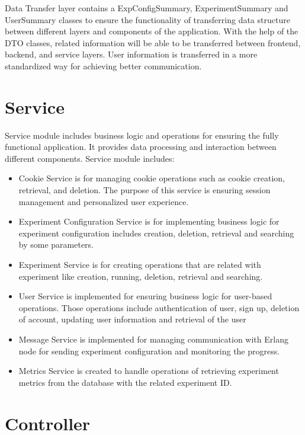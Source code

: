 Data Transfer layer contains a ExpConfigSummary, ExperimentSummary and UserSummary classes to ensure the functionality of transferring data structure between different layers and components of the application. With the help of the DTO classes,
related information will be able to be transferred between frontend, backend, and service layers. User information is transferred in a more standardized way
for achieving better communication.

\section{Service}

Service module includes business logic and operations for ensuring the fully functional application. It provides data processing and interaction between different components. Service module includes:\\
\begin{itemize}
    \item Cookie Service is for managing cookie operations such as cookie creation, retrieval, and deletion. The purpose of this service is ensuring session management and personalized user experience.
    \item Experiment Configuration Service is for implementing business logic for experiment configuration includes creation, deletion, retrieval and searching by some parameters.
    \item Experiment Service is for creating operations that are related with experiment like creation, running, deletion, retrieval and searching.
    \item User Service is implemented for ensuring business logic for user-based operations. Those operations include authentication of user, sign up, deletion of account, updating user information and retrieval of the user
    \item Message Service is implemented for managing communication with Erlang node for sending experiment configuration and monitoring the progress.
    \item Metrics Service is created to handle operations of retrieving experiment metrics from the database with the related experiment ID.
\end{itemize}

\section{Controller}

